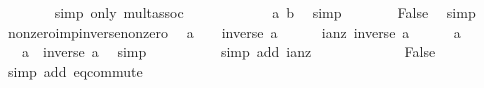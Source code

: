 \begin{isabellebody}
\ \ \ \ \ \ \isamarkupfalse%
\ {\isacharparenleft}{\kern0pt}simp\ only{\isacharcolon}{\kern0pt}\ mult{\isachardot}{\kern0pt}assoc{\isacharparenright}{\kern0pt}\isanewline
\ \ \ \ \isamarkupfalse%
\ \isamarkupfalse%
\ {\isachardoublequoteopen}{\isasymdots}\ {\isacharequal}{\kern0pt}\ {}{\isachardoublequoteclose}\ \isamarkupfalse%
\ a\ b\ \isamarkupfalse%
\ simp\isanewline
\ \ \ \ \isamarkupfalse%
\ \isamarkupfalse%
\ False\ \isamarkupfalse%
\ simp\isanewline
\ \ \isamarkupfalse%
\isanewline
{}\isamarkupfalse%
%
\endisatagproof
{\isafoldproof}%
%
\isadelimproof
\isanewline
%
\endisadelimproof
\isanewline
{}\isamarkupfalse%
\ nonzero{\isacharunderscore}{\kern0pt}imp{\isacharunderscore}{\kern0pt}inverse{\isacharunderscore}{\kern0pt}nonzero{\isacharcolon}{\kern0pt}\isanewline
\ \ {\isachardoublequoteopen}a\ {\isasymnoteq}\ {}\ {\isasymLongrightarrow}\ inverse\ a\ {\isasymnoteq}\ {}{\isachardoublequoteclose}\isanewline
%
\isadelimproof
%
\endisadelimproof
%
\isatagproof
{}\isamarkupfalse%
\isanewline
\ \ \isamarkupfalse%
\ ianz{\isacharcolon}{\kern0pt}\ {\isachardoublequoteopen}inverse\ a\ {\isacharequal}{\kern0pt}\ {}{\isachardoublequoteclose}\isanewline
\ \ \isamarkupfalse%
\ {\isachardoublequoteopen}a\ {\isasymnoteq}\ {}{\isachardoublequoteclose}\isanewline
\ \ \isamarkupfalse%
\ {\isachardoublequoteopen}{}\ {\isacharequal}{\kern0pt}\ a\ {\isacharasterisk}{\kern0pt}\ inverse\ a{\isachardoublequoteclose}\ \isamarkupfalse%
\ simp\isanewline
\ \ \isamarkupfalse%
\ \isamarkupfalse%
\ {\isachardoublequoteopen}{\isachardot}{\kern0pt}{\isachardot}{\kern0pt}{\isachardot}{\kern0pt}\ {\isacharequal}{\kern0pt}\ {}{\isachardoublequoteclose}\ \isamarkupfalse%
\ {\isacharparenleft}{\kern0pt}simp\ add{\isacharcolon}{\kern0pt}\ ianz{\isacharparenright}{\kern0pt}\isanewline
\ \ \isamarkupfalse%
\ \isamarkupfalse%
\ {\isachardoublequoteopen}{}\ {\isacharequal}{\kern0pt}\ {}{\isachardoublequoteclose}\ \isacommand{{\isachardot}{\kern0pt}}\isamarkupfalse%
\isanewline
\ \ \isamarkupfalse%
\ False\ \isamarkupfalse%
\ {\isacharparenleft}{\kern0pt}simp\ add{\isacharcolon}{\kern0pt}\ eq{\isacharunderscore}{\kern0pt}commute{\isacharparenright}{\kern0pt}\isanewline

\end{isabellebody}
